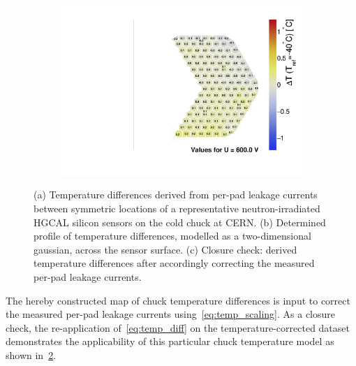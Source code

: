 \begin{figure}
\begin{subfigure}[b]{0.32\textwidth}
		\includegraphics[width=0.999\textwidth]{plots/chuck_temp_correction/Spring2021_ALPS_chucktempcorrected.pdf}
		\subcaption{
		}
		\label{plot:chucktemp_after}
	\end{subfigure}
	\caption{
		(a) Temperature differences derived from per-pad leakage currents between symmetric locations of a representative neutron-irradiated HGCAL silicon sensors on the cold chuck at CERN.
		(b) Determined profile of temperature differences, modelled as a two-dimensional gaussian, across the sensor surface.
		(c) Closure check: derived temperature differences after accordingly correcting the measured per-pad leakage currents.
	}
\end{figure}
The hereby constructed map of chuck temperature differences is input to correct the measured per-pad leakage currents using~\ref{eq:temp_scaling}.
As a closure check, the re-application of~\ref{eq:temp_diff} on the temperature-corrected dataset demonstrates the applicability of this particular chuck temperature model as shown in~\ref{plot:chucktemp_after}.
